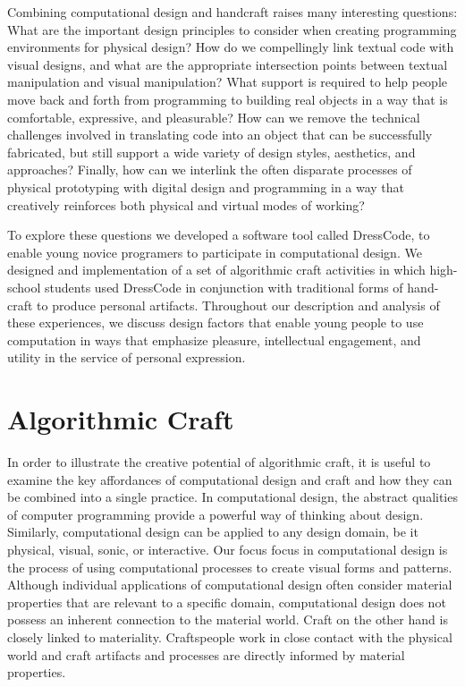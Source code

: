 \documentclass{sigchi}
\begin{document}
Combining computational design and handcraft raises many interesting questions:
What are the important design principles to consider when creating programming environments for physical design? How do we compellingly link textual code with visual designs, and what are the appropriate intersection points between textual manipulation and visual manipulation? What support is required to help people move back and forth from programming to building real objects in a way that is comfortable, expressive, and pleasurable? How can we remove the technical challenges involved in translating code into an object that can be successfully fabricated, but still support a wide variety of design styles, aesthetics, and approaches? Finally, how can we interlink the often disparate processes of physical prototyping with digital design and programming in a way that creatively reinforces both physical and virtual modes of working?

To explore these questions we developed a software tool called DressCode, to enable young novice programers to participate in computational design. We designed and implementation of a set of algorithmic craft activities in which high-school students used DressCode in conjunction with traditional forms of hand-craft to produce personal artifacts. Throughout our description and analysis of these experiences, we discuss design factors that enable young people to use computation in ways that emphasize pleasure, intellectual engagement, and utility in the service of personal expression.

\section{Algorithmic Craft}
In order to illustrate the creative potential of algorithmic craft, it is useful to examine the key affordances of computational design and craft and how they can be combined into a single practice. In computational design, the abstract qualities of computer programming provide a powerful way of thinking about design. Similarly, computational design can be applied to any design domain, be it physical, visual, sonic, or interactive. Our focus focus in computational design is the process of using computational processes to create visual forms and patterns. Although individual applications of computational design often consider material properties that are relevant to a specific domain, computational design does not possess an inherent connection to the material world. Craft on the other hand is closely linked to materiality. Craftspeople work in close contact with the physical world and craft artifacts and processes are directly informed by material properties. 
\end{document}
